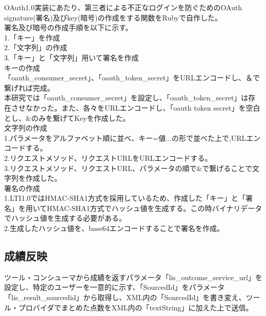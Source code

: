 OAuth1.0実装にあたり、第三者による不正なログインを防ぐためのOAuth signature(署名)及びkey(暗号)の作成をする関数をRubyで自作した。\\
署名及び暗号の作成手順を以下に示す。\\
1.「キー」を作成\\
2.「文字列」の作成\\
3.「キー」と「文字列」用いて署名を作成\\
キーの作成\\
「oauth\_consumer\_secret」、「oauth\_token\_secret」をURLエンコードし、＆で繋げれば完成。\\
本研究では「oauth\_consumer\_secret」を設定し、「oauth\_token\_secret」は存在させなかった。また、各々をURLエンコードし、「oauth token secret」を空白とし、\&のみを繋げてKeyを作成した。\\
文字列の作成\\
1.パラメータをアルファベット順に並べ、キー=値...の形で並べた上で,URLエンコードする。\\
2.リクエストメソッド、リクエストURLをURLエンコードする。\\
3.リクエストメソッド、リクエストURL、パラメータの順で\&で繋げることで文字列を作成した。\\
署名の作成\\
1.LTI1.0ではHMAC-SHA1方式を採用しているため、作成した「キー」と「署名」を用いてHMAC-SHA1方式でハッシュ値を生成する。この時バイナリデータでハッシュ値を生成する必要がある。\\
2.生成したハッシュ値を、base64エンコードすることで署名を作成。\\
\subsection{成績反映}
ツール・コンシューマから成績を返すパラメータ「lis\_outcome\_service\_url」を設定し、特定のユーザーを一意的に示す、「SourcedId」をパラメータ「lis\_result\_sourcedid」から取得し、XML内の「SourcedId」を書き変え、ツール・プロバイダでまとめた点数をXML内の「textString」に加えた上で送信。\\
